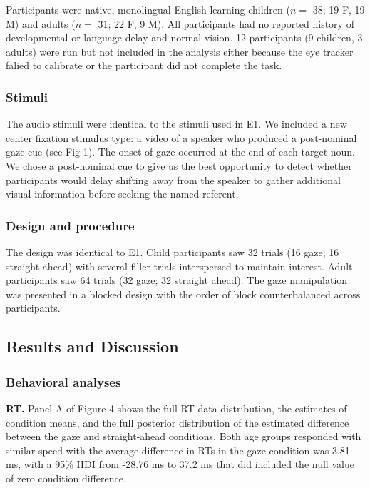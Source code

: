 \documentclass[10pt, letterpaper]{article}
\begin{document}
Participants were native, monolingual English-learning children (\(n=\)
38; 19 F, 19 M) and adults (\(n=\) 31; 22 F, 9 M). All participants had
no reported history of developmental or language delay and normal
vision. 12 participants (9 children, 3 adults) were run but not included
in the analysis either because the eye tracker falied to calibrate or
the participant did not complete the task.

\subsubsection{Stimuli}\label{stimuli-1}

The audio stimuli were identical to the stimuli used in E1. We included
a new center fixation stimulus type: a video of a speaker who produced a
post-nominal gaze cue (see Fig 1). The onset of gaze occurred at the end
of each target noun. We chose a post-nominal cue to give us the best
opportunity to detect whether participants would delay shifting away
from the speaker to gather additional visual information before seeking
the named referent.

\subsubsection{Design and procedure}\label{design-and-procedure-1}

The design was identical to E1. Child participants saw 32 trials (16
gaze; 16 straight ahead) with several filler trials interspersed to
maintain interest. Adult participants saw 64 trials (32 gaze; 32
straight ahead). The gaze manipulation was presented in a blocked design
with the order of block counterbalanced across participants.

\subsection{Results and Discussion}\label{results-and-discussion-1}

\subsubsection{Behavioral analyses}\label{behavioral-analyses-1}

\textbf{RT.} Panel A of Figure 4 shows the full RT data distribution,
the estimates of condition means, and the full posterior distribution of
the estimated difference between the gaze and straight-ahead conditions.
Both age groups responded with similar speed with the average difference
in RTs in the gaze condition was 3.81 ms, with a 95\% HDI from -28.76 ms
to 37.2 ms that did included the null value of zero condition
difference.
\end{document}
